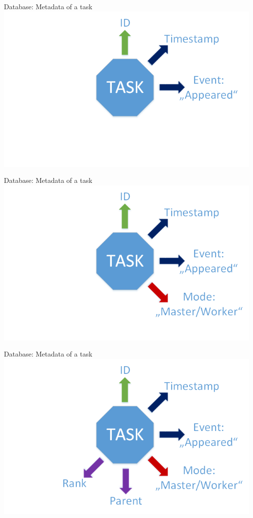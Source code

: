 	\begin{frame}{Database: Metadata of a task}
	\includegraphics[width=1.0\textwidth]{images/Task/zeichnungstep3.png}
	\end{frame}
	
	\begin{frame}{Database: Metadata of a task}
	\includegraphics[width=1.0\textwidth]{images/Task/zeichnungstep2.png}
	\end{frame}
	
	\begin{frame}{Database: Metadata of a task}
	\includegraphics[width=1.0\textwidth]{images/Task/zeichnungstep1.png}
	\end{frame}
	
